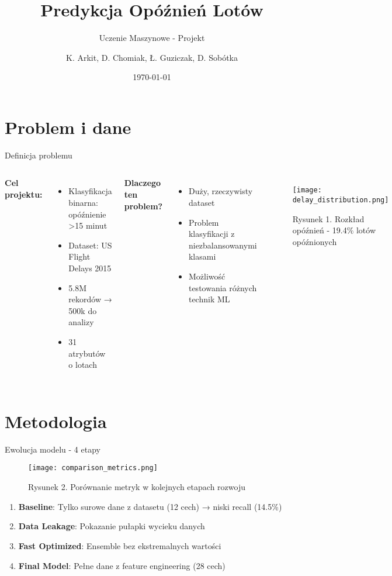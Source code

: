 \documentclass[12pt,aspectratio=169]{beamer}
\title{Predykcja Opóźnień Lotów}
\subtitle{Uczenie Maszynowe - Projekt}
\author{K. Arkit, D. Chomiak, Ł. Guziczak, D. Sobótka}
\institute{}
\date{\today}
\begin{document}
\begin{frame}
\titlepage
\end{frame}

\section{Problem i dane}

\begin{frame}{Definicja problemu}
\begin{columns}
\textbf{Cel projektu:}
\begin{itemize}
    \item Klasyfikacja binarna: opóźnienie >15 minut
    \item Dataset: US Flight Delays 2015
    \item 5.8M rekordów → 500k do analizy
    \item 31 atrybutów o lotach
\end{itemize}

\vspace{0.5cm}
\textbf{Dlaczego ten problem?}
\begin{itemize}
    \item Duży, rzeczywisty dataset
    \item Problem klasyfikacji z niezbalansowanymi klasami
    \item Możliwość testowania różnych technik ML
\end{itemize}

\begin{figure}
    \centering
    \texttt{[image: delay\_distribution.png]}
    \caption{Rysunek 1. Rozkład opóźnień - 19.4\% lotów opóźnionych}
\end{figure}
\end{columns}
\end{frame}

\section{Metodologia}

\begin{frame}{Ewolucja modelu - 4 etapy}
\begin{figure}
    \centering
    \texttt{[image: comparison\_metrics.png]}
    \caption{Rysunek 2. Porównanie metryk w kolejnych etapach rozwoju}
\end{figure}

\begin{enumerate}
    \item \textbf{Baseline}: Tylko surowe dane z datasetu (12 cech) → niski recall (14.5\%)
    \item \textbf{Data Leakage}: Pokazanie pułapki wycieku danych
    \item \textbf{Fast Optimized}: Ensemble bez ekstremalnych wartości
    \item \textbf{Final Model}: Pełne dane z feature engineering (28 cech)
\end{enumerate}
\end{frame}
\end{document}
